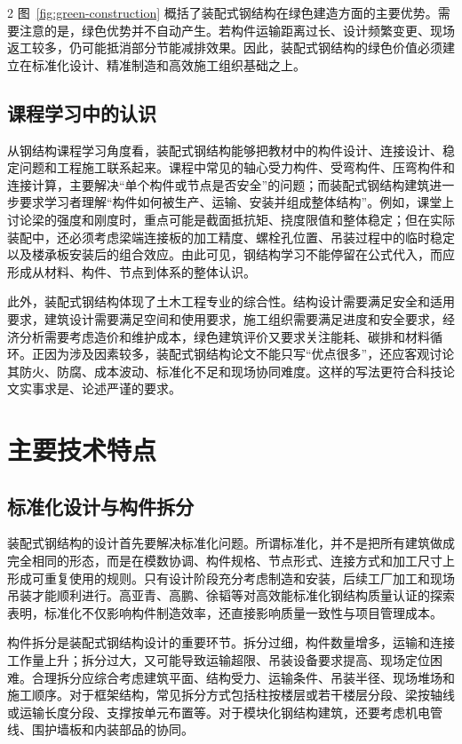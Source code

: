 \documentclass[UTF8,a4paper,10.5pt]{ctexart}
\newenvironment{bodytext}{\fontsize{10.5pt}{16pt}\selectfont\songti}{}
\begin{document}
\begin{bodytext}
\begin{multicols}{2}
图~\ref{fig:green-construction} 概括了装配式钢结构在绿色建造方面的主要优势。需要注意的是，绿色优势并不自动产生。若构件运输距离过长、设计频繁变更、现场返工较多，仍可能抵消部分节能减排效果。因此，装配式钢结构的绿色价值必须建立在标准化设计、精准制造和高效施工组织基础之上。

\subsection{课程学习中的认识}

从钢结构课程学习角度看，装配式钢结构能够把教材中的构件设计、连接设计、稳定问题和工程施工联系起来。课程中常见的轴心受力构件、受弯构件、压弯构件和连接计算，主要解决“单个构件或节点是否安全”的问题；而装配式钢结构建筑进一步要求学习者理解“构件如何被生产、运输、安装并组成整体结构”。例如，课堂上讨论梁的强度和刚度时，重点可能是截面抵抗矩、挠度限值和整体稳定；但在实际装配中，还必须考虑梁端连接板的加工精度、螺栓孔位置、吊装过程中的临时稳定以及楼承板安装后的组合效应。由此可见，钢结构学习不能停留在公式代入，而应形成从材料、构件、节点到体系的整体认识。

此外，装配式钢结构体现了土木工程专业的综合性。结构设计需要满足安全和适用要求，建筑设计需要满足空间和使用要求，施工组织需要满足进度和安全要求，经济分析需要考虑造价和维护成本，绿色建筑评价又要求关注能耗、碳排和材料循环。正因为涉及因素较多，装配式钢结构论文不能只写“优点很多”，还应客观讨论其防火、防腐、成本波动、标准化不足和现场协同难度。这样的写法更符合科技论文实事求是、论述严谨的要求。

\section{主要技术特点}

\subsection{标准化设计与构件拆分}

装配式钢结构的设计首先要解决标准化问题。所谓标准化，并不是把所有建筑做成完全相同的形态，而是在模数协调、构件规格、节点形式、连接方式和加工尺寸上形成可重复使用的规则。只有设计阶段充分考虑制造和安装，后续工厂加工和现场吊装才能顺利进行。高亚青、高鹏、徐韬等对高效能标准化钢结构质量认证的探索表明，标准化不仅影响构件制造效率，还直接影响质量一致性与项目管理成本\cite{ref-r7}。

构件拆分是装配式钢结构设计的重要环节。拆分过细，构件数量增多，运输和连接工作量上升；拆分过大，又可能导致运输超限、吊装设备要求提高、现场定位困难。合理拆分应综合考虑建筑平面、结构受力、运输条件、吊装半径、现场堆场和施工顺序。对于框架结构，常见拆分方式包括柱按楼层或若干楼层分段、梁按轴线或运输长度分段、支撑按单元布置等。对于模块化钢结构建筑，还要考虑机电管线、围护墙板和内装部品的协同。


\end{multicols}
\end{bodytext}
\end{document}
